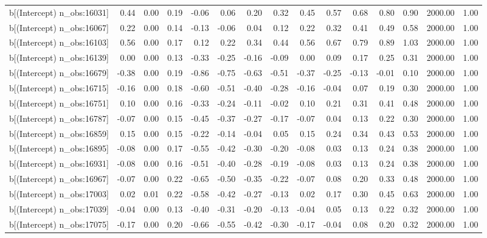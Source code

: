 \begin{table}[ht]
\begin{tabular}{rrrrrrrrrrrrrrr}
  b[(Intercept) n\_obs:16031] & 0.44 & 0.00 & 0.19 & -0.06 & 0.06 & 0.20 & 0.32 & 0.45 & 0.57 & 0.68 & 0.80 & 0.90 & 2000.00 & 1.00 \\ 
  b[(Intercept) n\_obs:16067] & 0.22 & 0.00 & 0.14 & -0.13 & -0.06 & 0.04 & 0.12 & 0.22 & 0.32 & 0.41 & 0.49 & 0.58 & 2000.00 & 1.00 \\ 
  b[(Intercept) n\_obs:16103] & 0.56 & 0.00 & 0.17 & 0.12 & 0.22 & 0.34 & 0.44 & 0.56 & 0.67 & 0.79 & 0.89 & 1.03 & 2000.00 & 1.00 \\ 
  b[(Intercept) n\_obs:16139] & 0.00 & 0.00 & 0.13 & -0.33 & -0.25 & -0.16 & -0.09 & 0.00 & 0.09 & 0.17 & 0.25 & 0.31 & 2000.00 & 1.00 \\ 
  b[(Intercept) n\_obs:16679] & -0.38 & 0.00 & 0.19 & -0.86 & -0.75 & -0.63 & -0.51 & -0.37 & -0.25 & -0.13 & -0.01 & 0.10 & 2000.00 & 1.00 \\ 
  b[(Intercept) n\_obs:16715] & -0.16 & 0.00 & 0.18 & -0.60 & -0.51 & -0.40 & -0.28 & -0.16 & -0.04 & 0.07 & 0.19 & 0.30 & 2000.00 & 1.00 \\ 
  b[(Intercept) n\_obs:16751] & 0.10 & 0.00 & 0.16 & -0.33 & -0.24 & -0.11 & -0.02 & 0.10 & 0.21 & 0.31 & 0.41 & 0.48 & 2000.00 & 1.00 \\ 
  b[(Intercept) n\_obs:16787] & -0.07 & 0.00 & 0.15 & -0.45 & -0.37 & -0.27 & -0.17 & -0.07 & 0.04 & 0.13 & 0.22 & 0.30 & 2000.00 & 1.00 \\ 
  b[(Intercept) n\_obs:16859] & 0.15 & 0.00 & 0.15 & -0.22 & -0.14 & -0.04 & 0.05 & 0.15 & 0.24 & 0.34 & 0.43 & 0.53 & 2000.00 & 1.00 \\ 
  b[(Intercept) n\_obs:16895] & -0.08 & 0.00 & 0.17 & -0.55 & -0.42 & -0.30 & -0.20 & -0.08 & 0.03 & 0.13 & 0.24 & 0.38 & 2000.00 & 1.00 \\ 
  b[(Intercept) n\_obs:16931] & -0.08 & 0.00 & 0.16 & -0.51 & -0.40 & -0.28 & -0.19 & -0.08 & 0.03 & 0.13 & 0.24 & 0.38 & 2000.00 & 1.00 \\ 
  b[(Intercept) n\_obs:16967] & -0.07 & 0.00 & 0.22 & -0.65 & -0.50 & -0.35 & -0.22 & -0.07 & 0.08 & 0.20 & 0.33 & 0.48 & 2000.00 & 1.00 \\ 
  b[(Intercept) n\_obs:17003] & 0.02 & 0.01 & 0.22 & -0.58 & -0.42 & -0.27 & -0.13 & 0.02 & 0.17 & 0.30 & 0.45 & 0.63 & 2000.00 & 1.00 \\ 
  b[(Intercept) n\_obs:17039] & -0.04 & 0.00 & 0.13 & -0.40 & -0.31 & -0.20 & -0.13 & -0.04 & 0.05 & 0.13 & 0.22 & 0.32 & 2000.00 & 1.00 \\ 
  b[(Intercept) n\_obs:17075] & -0.17 & 0.00 & 0.20 & -0.66 & -0.55 & -0.42 & -0.30 & -0.17 & -0.04 & 0.08 & 0.20 & 0.32 & 2000.00 & 1.00 \\ 

\end{tabular}
\end{table}
